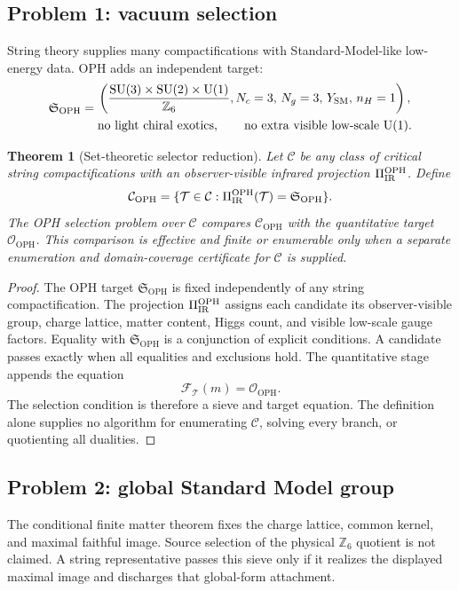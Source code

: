\documentclass[11pt]{article}
\newtheorem{theorem}{Theorem}[section]
\theoremstyle{remark}
\theoremstyle{plain}
\newcommand{\OPH}{\mathrm{OPH}}
\newcommand{\SU}{\mathrm{SU}}
\newcommand{\U}{\mathrm{U}}
\newcommand{\Z}{\mathbb Z}
\newcommand{\calF}{\mathcal F}
\newcommand{\calO}{\mathcal O}
\begin{document}
\subsection{Problem 1: vacuum selection}

String theory supplies many compactifications with Standard-Model-like low-energy data. OPH
adds an independent target:
\[
\mathfrak S_{\OPH}=
\begin{gathered}
\left(
\frac{\SU(3)\times\SU(2)\times\U(1)}{\Z_6},
N_c=3,\,
N_g=3,\,
Y_{\rm SM},\,
n_H=1
\right),\\
\text{no light chiral exotics},\qquad
\text{no extra visible low-scale }\U(1).
\end{gathered}
\]

\begin{theorem}[Set-theoretic selector reduction]
Let \(\mathcal C\) be any class of critical string compactifications with an observer-visible
infrared projection \(\Pi_{\rm IR}^{\OPH}\). Define
\[
\mathcal C_{\OPH}=
\{\mathcal T\in\mathcal C:\Pi_{\rm IR}^{\OPH}(\mathcal T)=\mathfrak S_{\OPH}\}.
\]
The OPH selection problem over \(\mathcal C\) compares \(\mathcal C_{\OPH}\) with the
quantitative target \(\calO_{\OPH}\). This comparison is effective and finite or enumerable only when a
separate enumeration and domain-coverage certificate for \(\mathcal C\) is supplied.
\end{theorem}

\begin{proof}
The OPH target \(\mathfrak S_{\OPH}\) is fixed independently of any string compactification. The
projection \(\Pi_{\rm IR}^{\OPH}\) assigns each candidate its observer-visible group, charge
lattice, matter content, Higgs count, and visible low-scale gauge factors. Equality with
\(\mathfrak S_{\OPH}\) is a conjunction of explicit conditions. A candidate passes exactly when all
equalities and exclusions hold. The quantitative stage appends the equation
\[
\calF_{\mathcal T}(m)=\calO_{\OPH}.
\]
The selection condition is therefore a sieve and target equation. The definition alone supplies no
algorithm for enumerating \(\mathcal C\), solving every branch, or quotienting all dualities.
\end{proof}

\subsection{Problem 2: global Standard Model group}

The conditional finite matter theorem fixes the charge lattice, common
kernel, and maximal faithful image. Source selection of the physical
\(\mathbb Z_6\) quotient is not claimed. A string representative passes
this sieve only if it realizes the displayed maximal image and discharges
that global-form attachment.
\end{document}
